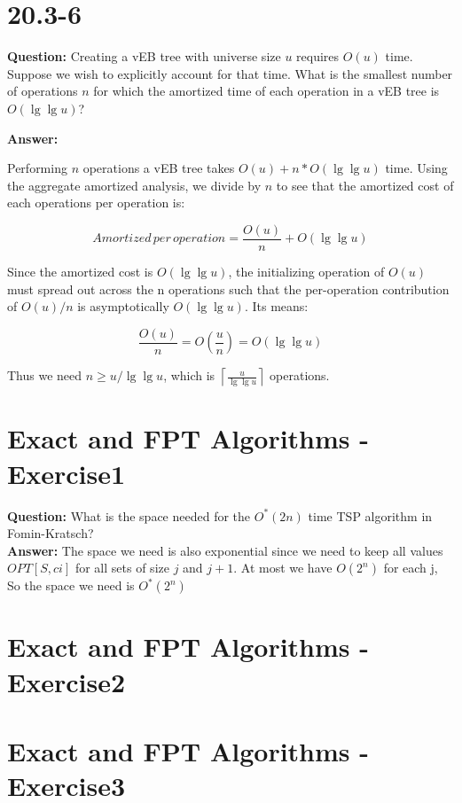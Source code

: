 \documentclass[12pt]{article}
\begin{document}
\section{20.3-6}
\textbf{Question: } 
Creating a vEB tree with universe size $u$ requires $O(u)$ time. Suppose we wish to explicitly account for that time. What is the smallest number of operations $n$ for which the amortized time of each operation in a vEB tree is $O(\lg\lg u)$?

\textbf{Answer:}

Performing $n$ operations a vEB tree takes $O(u) + n*O(\lg\lg u)$ time. Using the aggregate amortized analysis, we divide by $n$ to see that the amortized cost of each operations  per operation is:

\begin{equation}
Amortized \, per \, operation = \frac{O(u)}{n} + O(\lg\lg u) 
\end{equation} 

Since the amortized cost is $O(\lg \lg u)$, the initializing operation of $O(u)$ must spread out across  the n operations such that the per-operation contribution of $O(u)/n$ is asymptotically $O(\lg \lg u)$. Its means:

\begin{equation}
\frac{O(u)}{n}=O(\frac{u}{n}) = O( \lg \lg u)
\end{equation}

Thus we need $n \ge u/ \lg \lg u$, which is $\displaystyle \left \lceil \frac{u}{\lg\lg u} \right \rceil$ operations.


\section{Exact and FPT Algorithms - Exercise1}
\textbf{Question:} What is the space needed for the \(O^*(2n)\) time TSP algorithm in Fomin-Kratsch?\\
\textbf{Answer:} The space we need is also exponential since we need to keep all values \(OPT[S,ci]\) for all sets of size \(j\) and \(j+1\). At most we have \(O(2^n)\) for each j, So the space we need is \(O^*(2^n)\)


\section{Exact and FPT Algorithms - Exercise2}

\section{Exact and FPT Algorithms - Exercise3}
\end{document}
